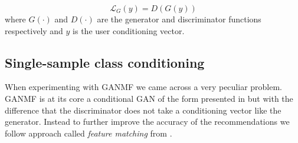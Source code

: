\begin{equation}
    \mathcal{L}_{G}(y) = D(G(y))
\end{equation}
where $G(\cdot)$ and $D(\cdot)$ are the generator and discriminator functions respectively and $y$ is the user conditioning vector.

\subsection{Single-sample class conditioning}
\label{sec:ss_class_conditioning}
When experimenting with GANMF we came across a very peculiar problem. %
GANMF is at its core a conditional GAN of the form presented in \cite{mirza2014conditional} but with the difference that the discriminator does not take a conditioning vector like the generator. Instead to further improve the accuracy of the recommendations we follow approach called \emph{feature matching} from \cite{salimans2016improved}. 